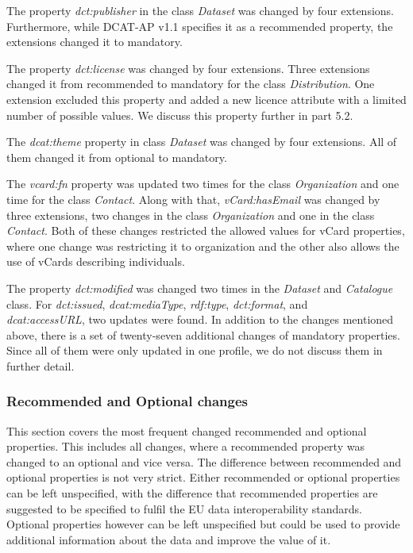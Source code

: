 \documentclass[<options>]{elsarticle}
\begin{document}
The property \textit{dct:publisher} in the class \textit{Dataset} was changed by four extensions. Furthermore, while DCAT-AP v1.1 specifies it as a recommended property, the extensions changed it to mandatory.

The property \textit{dct:license} was changed by four extensions. Three extensions changed it from recommended to mandatory for the class \textit{Distribution}. One extension excluded this property and added a new licence attribute with a limited number of possible values. We discuss this property further in part 5.2.

The \textit{dcat:theme} property in class \textit{Dataset} was changed by four extensions. All of them changed it from optional to mandatory.

The \textit{vcard:fn} property was updated two times for the class \textit{Organization} and one time for the class \textit{Contact}. Along with that, \textit{vCard:hasEmail} was changed by three extensions, two changes in the class \textit{Organization} and one in the class \textit{Contact}. Both of these changes restricted the allowed values for vCard properties, where one change was restricting it to organization and the other also allows the use of vCards describing individuals. 

The property \textit{dct:modified} was changed two times in the \textit{Dataset} and \textit{Catalogue} class. For \textit{dct:issued}, \textit{dcat:mediaType}, \textit{rdf:type}, \textit{dct:format}, and \\ \textit{dcat:accessURL}, two updates were found.
In addition to the changes mentioned above, there is a set of twenty-seven additional changes of mandatory properties. Since all of them were only updated in one profile, we do not discuss them in further detail.

\subsubsection{Recommended and Optional changes}
This section covers the most frequent changed recommended and optional properties. This includes all changes, where a recommended property was changed to an optional and vice versa. The difference between recommended and optional properties is not very strict. Either recommended or optional properties can be left unspecified, with the difference that recommended properties are suggested to be specified to fulfil the EU data interoperability standards. Optional properties however can be left unspecified but could be used to provide additional information about the data and improve the value of it.  
\end{document}

